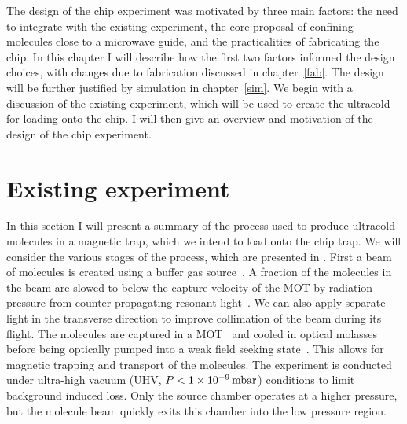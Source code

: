 The design of the \CaF{} chip experiment was motivated by three main factors:
the need to integrate with the existing experiment, the core proposal of
confining molecules close to a microwave guide, and the practicalities of
fabricating the chip. In this chapter I will describe how the first two factors
informed the design choices, with changes due to fabrication discussed in
chapter~\ref{fab}. The design will be further justified by simulation in
chapter~\ref{sim}.
%
We begin with a discussion of the existing experiment, which will be used to
create the ultracold \CaF{} for loading onto the chip. I will then give an
overview and motivation of the design of the chip experiment.


\section{Existing \CaF{} experiment}
\label{overview:existing}

In this section I will present a summary of the process used to produce
ultracold \CaF{} molecules in a magnetic trap, which we intend to load onto the
chip trap. We will consider the various stages of the process, which are
presented in . First a beam of \CaF{}
molecules is created using a buffer gas source~\cite{Truppe2018}. A fraction of
the molecules in the beam are slowed to below the capture velocity of the MOT
by radiation pressure from counter-propagating resonant
light~\cite{Truppe2017a}. We can also apply separate light in the transverse direction
to improve collimation of the beam during its flight.
The molecules are captured in a MOT~\cite{Williams2017} and cooled in optical
molasses~\cite{Truppe2017} before being optically pumped into a weak field
seeking state~\cite{WilliamsMagnetic2018}. This allows for magnetic trapping
and transport of the molecules. The experiment is conducted under ultra-high
vacuum (UHV, $P<\SI{1E-9}{\milli\bar}$) conditions to limit background induced
loss. Only the source chamber operates at a higher pressure, but the molecule
beam quickly exits this chamber into the low pressure region. 

